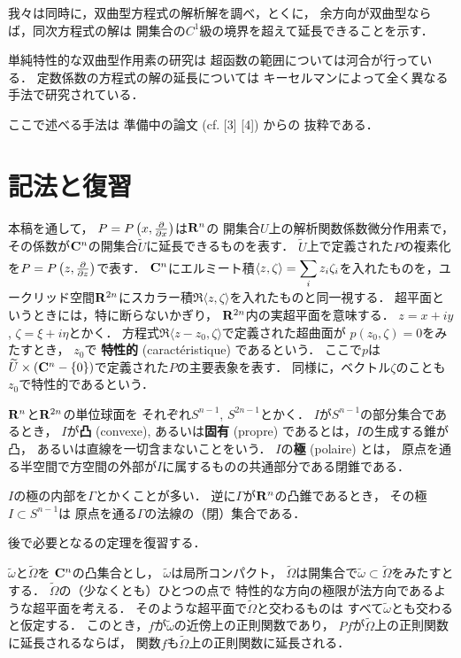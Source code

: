 我々は同時に，双曲型方程式の解析解を調べ，とくに，
余方向が双曲型ならば，同次方程式の解は
開集合の\(C^1\)級の境界を超えて延長できることを示す．

単純特性的な双曲型作用素の研究は
超函数の範囲については河合\cite{7}が行っている．
定数係数の方程式の解の延長については
キーセルマン\cite{8}によって全く異なる手法で研究されている．

ここで述べる手法は
準備中の論文 (cf. \cite{BS72a} \cite{BS72b} [3] [4]) からの
抜粋である．

\section{記法と復習}

本稿を通して，
\(P=P\left(x,\frac{\partial}{\partial{x}}\right)\)は\(\mathbf{R}^n\)の
開集合\(U\)上の解析関数係数微分作用素で，
その係数が\(\mathbf{C}^n\)の開集合\(\widetilde{U}\)に延長できるものを表す．
\(\widetilde{U}\)上で定義された\(P\)の複素化を\(
    P=P\left(z,\frac{\partial}{\partial z}\right)
\)で表す．
\(\mathbf{C}^n\)にエルミート積\(\displaystyle
    \langle z,\zeta\rangle=\sum_{i}^{}z_i\zeta_i
\)を入れたものを，ユークリッド空間\(\mathbf{R}^{2n}\)にスカラー積\(
    \Re\langle z,\zeta\rangle
\)を入れたものと同一視する．
超平面というときには，特に断らないかぎり，
\(\mathbf{R}^{2n}\)内の実超平面を意味する．
\(z=x+iy\), \(\zeta=\xi+i\eta\)とかく．
方程式\(\Re\langle z-z_0,\zeta\rangle\)で定義された超曲面が
\(p(z_0,\zeta)=0\)をみたすとき，
\(z_0\)で
\textbf{特性的} (caract\'eristique) であるという．
ここで\(p\)は\(
    \widetilde{U}\times\left(\mathbf{C}^n-\{0\}\right)
\)で定義された\(P\)の主要表象を表す．
同様に，ベクトル\(\zeta\)のことも\(z_0\)で特性的であるという．

\(\mathbf{R}^n\)と\(\mathbf{R}^{2n}\)の単位球面を
それぞれ\(S^{n-1}\), \(S^{2n-1}\)とかく．
\(I\)が\(S^{n-1}\)の部分集合であるとき，
\(I\)が\textbf{凸} (convexe), 
あるいは\textbf{固有} (propre) であるとは，\(I\)の生成する錐が凸，
あるいは直線を一切含まないことをいう．
\(I\)の\textbf{極} (polaire) とは，
原点を通る半空間で方空間の外部が\(I\)に属するものの共通部分である閉錐である．

\(I\)の極の内部を\(\varGamma\)とかくことが多い．
逆に\(\varGamma\)が\(\mathbf{R}^n\)の凸錐であるとき，
その極\(I\subset S^{n-1}\)は
原点を通る\(\varGamma\)の法線の（閉）集合である．

後で必要となる\cite{3}の定理を復習する．

\begin{THM}
    \(\widetilde{\omega}\)と\(\widetilde{\varOmega}\)を
    \(\mathbf{C}^n\)の凸集合とし，
    \(\widetilde{\omega}\)は局所コンパクト，
    \(\widetilde{\varOmega}\)は開集合で\(
        \widetilde{\omega}\subset\widetilde{\varOmega}
    \)をみたすとする．
    \(\widetilde{\varOmega}\)の（少なくとも）ひとつの点で
    特性的な方向の極限が法方向であるような超平面を考える．
    そのような超平面で\(\widetilde{\varOmega}\)と交わるものは
    すべて\(\widetilde{\omega}\)とも交わると仮定する．
    このとき，\(f\)が\(\widetilde{\omega}\)の近傍上の正則関数であり，
    \(Pf\)が\(\widetilde{\varOmega}\)上の正則関数に延長されるならば，
    関数\(f\)も\(\widetilde{\varOmega}\)上の正則関数に延長される．
\end{THM}

